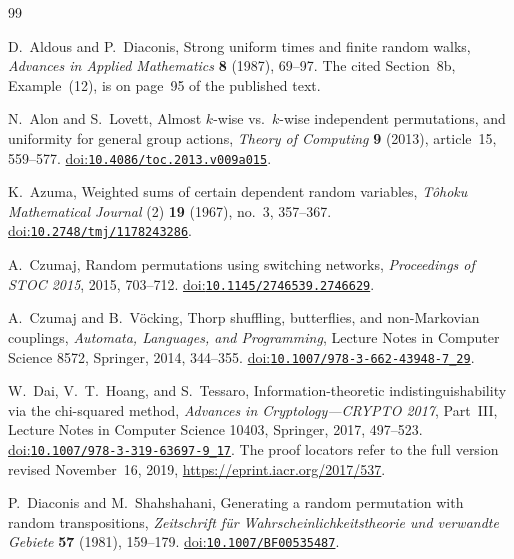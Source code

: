 {}
\begingroup
\raggedright
{}
\begin{thebibliography}{99}
\setlength{\itemsep}{0.3\baselineskip}

D.~Aldous and P.~Diaconis,
Strong uniform times and finite random walks,
\emph{Advances in Applied Mathematics} \textbf{8} (1987), 69--97.
The cited Section~8b, Example~(12), is on page~95 of the published text.

N.~Alon and S.~Lovett,
Almost $k$-wise vs.\ $k$-wise independent permutations, and uniformity
for general group actions,
\emph{Theory of Computing} \textbf{9} (2013), article~15, 559--577.
\href{https://doi.org/10.4086/toc.2013.v009a015}{doi:\nolinkurl{10.4086/toc.2013.v009a015}}.

K.~Azuma,
Weighted sums of certain dependent random variables,
\emph{T\^ohoku Mathematical Journal} (2) \textbf{19} (1967), no.~3, 357--367.
\href{https://doi.org/10.2748/tmj/1178243286}{doi:\nolinkurl{10.2748/tmj/1178243286}}.

A.~Czumaj,
Random permutations using switching networks,
\emph{Proceedings of STOC 2015}, 2015, 703--712.
\href{https://doi.org/10.1145/2746539.2746629}{doi:\nolinkurl{10.1145/2746539.2746629}}.

A.~Czumaj and B.~V\"ocking,
Thorp shuffling, butterflies, and non-Markovian couplings,
\emph{Automata, Languages, and Programming},
Lecture Notes in Computer Science 8572, Springer, 2014, 344--355.
\href{https://doi.org/10.1007/978-3-662-43948-7_29}{doi:\nolinkurl{10.1007/978-3-662-43948-7_29}}.

W.~Dai, V.~T.~Hoang, and S.~Tessaro,
Information-theoretic indistinguishability via the chi-squared method,
\emph{Advances in Cryptology---CRYPTO 2017}, Part~III,
Lecture Notes in Computer Science 10403, Springer, 2017, 497--523.
\href{https://doi.org/10.1007/978-3-319-63697-9_17}{doi:\nolinkurl{10.1007/978-3-319-63697-9_17}}.
The proof locators refer to the full version revised November~16, 2019,
\url{https://eprint.iacr.org/2017/537}.

P.~Diaconis and M.~Shahshahani,
Generating a random permutation with random transpositions,
\emph{Zeitschrift f\"ur Wahrscheinlichkeitstheorie und verwandte Gebiete}
\textbf{57} (1981), 159--179.
\href{https://doi.org/10.1007/BF00535487}{doi:\nolinkurl{10.1007/BF00535487}}.


\end{thebibliography}
